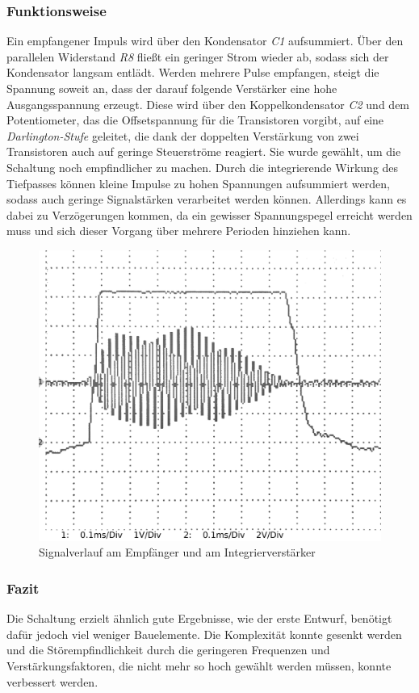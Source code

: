 \subsubsection{Funktionsweise}
Ein empfangener Impuls wird über den Kondensator \textit{C1} aufsummiert. Über den parallelen Widerstand \textit{R8} fließt ein geringer Strom wieder ab, sodass sich der Kondensator langsam entlädt. Werden mehrere Pulse empfangen, steigt die Spannung soweit an, dass der darauf folgende Verstärker eine hohe Ausgangsspannung erzeugt. Diese wird über den Koppelkondensator \textit{C2} und dem Potentiometer, das die Offsetspannung für die Transistoren vorgibt, auf eine \textit{Darlington-Stufe} geleitet, die dank der doppelten Verstärkung von zwei Transistoren auch auf geringe Steuerströme reagiert. Sie wurde gewählt, um die Schaltung noch empfindlicher zu machen. Durch die integrierende Wirkung des Tiefpasses können kleine Impulse zu hohen Spannungen aufsummiert werden, sodass auch geringe Signalstärken verarbeitet werden können. Allerdings kann es dabei zu Verzögerungen kommen, da ein gewisser Spannungspegel erreicht werden muss und sich dieser Vorgang über mehrere Perioden hinziehen kann.
\begin{figure}[h]
	\centering
	\includegraphics[width=(\textwidth), angle=0]{oszi/15-05-15/3.png}
	\caption{Signalverlauf am Empfänger und am Integrierverstärker} \label{img:I12}
\end{figure}


\subsubsection{Fazit}
Die Schaltung erzielt ähnlich gute Ergebnisse, wie der erste Entwurf, benötigt dafür jedoch viel weniger Bauelemente. Die Komplexität konnte gesenkt werden und die Störempfindlichkeit durch die geringeren Frequenzen und Verstärkungsfaktoren, die nicht mehr so hoch gewählt werden müssen, konnte verbessert werden.

